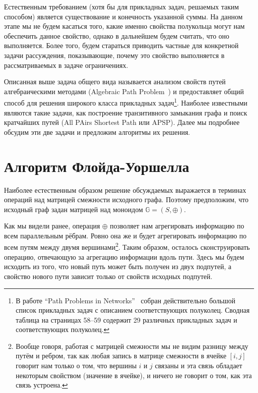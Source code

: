 Естественным требованием (хотя бы для прикладных задач, решаемых таким способом) является существование и конечность указанной суммы. На данном этапе мы не будем касаться того, какие именно свойства полукольца могут нам обеспечить данное свойство, однако в дальнейшем будем считать, что оно выполняется. Более того, будем стараться приводить частные для конкретной задачи рассуждения, показывающие, почему это свойство выполняется в рассматриваемых в задаче ограничениях.

Описанная выше задача общего вида называется анализом свойств путей алгебраическими методами (Algebraic Path Problem~\cite{Baras2010PathPI}) и предоставляет общий способ для решения широкого класса прикладных задач\footnote{В работе ``Path Problems in Networks''~\cite{Baras2010PathPI} собран действительно большой список прикладных задач с описанием соответствующих полуколец. Сводная таблица на страницах 58--59 содержит 29 различных прикладных задач и соответствующих полуколец.}. Наиболее известными являются такие задачи, как построение транзитивного замыкания графа и поиск кратчайших путей (All PAirs Shortest Path или APSP). Далее мы подробнее обсудим эти две задачи и предложим алгоритмы их решения.


\section{Алгоритм Флойда-Уоршелла}

Наиболее естественным образом решение обсуждаемых выражается в терминах операций над матрицей смежности исходного графа. Поэтому предположим, что исходный граф задан матрицей над моноидом $\mathbb{G} = (S,\oplus)$.

Как мы видели ранее, операция $\oplus$ позволяет нам агрегировать информацию по всем параллельным рёбрам. Ровно она же и будет агрегировать информацию по всем путям между двумя вершинами\footnote{Вообще говоря, работая с матрицей смежности мы не видим разницу между путём и ребром, так как любая запись в матрице смежности в ячейке $[i,j]$ говорит нам только о том, что вершины $i$ и $j$ связаны и эта связь обладает некоторым свойством (значение в ячейке), и ничего не говорит о том, как эта связь устроена.}. Таким образом, осталось сконструировать операцию, отвечающую за агрегацию информации вдоль пути. Здесь мы будем исходить из того, что новый путь может быть получен из двух подпутей, а свойство нового пути зависит только от свойств исходных подпутей.

